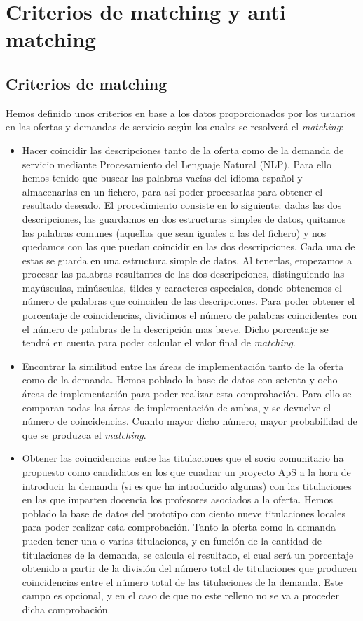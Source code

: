 \documentclass[11pt]{book}
\begin{document}
\section{Criterios de matching y anti matching}
\subsection{Criterios de matching }

Hemos definido unos criterios en base a los datos proporcionados por los usuarios en las ofertas y demandas de servicio según los cuales se resolverá el \emph{matching}:

\begin{itemize} 	
	\item Hacer coincidir las descripciones tanto de la oferta como de la demanda de servicio mediante Procesamiento del Lenguaje Natural (NLP).
	Para ello hemos tenido que buscar las palabras vacías del idioma español y almacenarlas en un fichero, para así poder  procesarlas para obtener el resultado deseado. El procedimiento consiste en lo siguiente: dadas las dos descripciones, las guardamos en dos estructuras simples de datos, quitamos las palabras comunes (aquellas que sean iguales a las del fichero) y nos quedamos con las que puedan coincidir en las dos descripciones. Cada una de estas se guarda en una estructura simple de datos. Al tenerlas, empezamos a procesar las palabras resultantes de las dos descripciones, distinguiendo las mayúsculas, minúsculas, tildes y caracteres especiales, donde obtenemos el número de palabras que coinciden de las descripciones. Para poder obtener el porcentaje de coincidencias, dividimos el número de palabras coincidentes con el número de palabras de la descripción mas breve. Dicho porcentaje se tendrá en cuenta para poder calcular el valor final de \emph{matching}.
	
	\item Encontrar la similitud entre las áreas de implementación tanto de la oferta como de la demanda. Hemos poblado la base de datos con setenta y ocho áreas de implementación para poder realizar esta comprobación. Para ello se comparan todas las áreas de implementación de ambas, y se devuelve el número de coincidencias. Cuanto mayor dicho número, mayor probabilidad de que se produzca el \emph{matching}.
	
	\item Obtener las coincidencias entre las titulaciones que el socio
	comunitario ha propuesto como candidatos en los que cuadrar un proyecto
	ApS a la hora de introducir la demanda (si es que ha introducido algunas) con las titulaciones en las que imparten docencia los profesores asociados a la oferta. 
	Hemos poblado la base de datos del prototipo con ciento nueve titulaciones locales para poder realizar esta comprobación. Tanto la oferta como la demanda pueden tener una o varias titulaciones, y en función de la cantidad de titulaciones de la demanda, se calcula el resultado, el cual será un porcentaje obtenido a partir de la división del número total de titulaciones que producen coincidencias entre el  número total de las titulaciones de la demanda. Este campo es opcional, y en el caso de que no este relleno no se va a proceder dicha comprobación.
	

\end{itemize}
\end{document}
